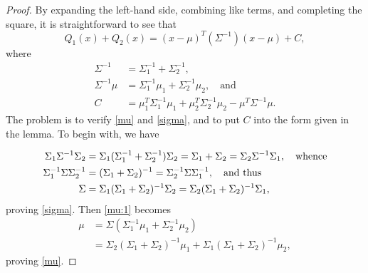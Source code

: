\documentclass[12pt,leqno]{article}
\begin{document}
\begin{proof}

  By expanding the left-hand side, combining like terms, and completing the
  square, it is straightforward to see that
$$
Q_1(x) + Q_2(x) = (x-\mu)^T(\Sigma^{-1})(x-\mu) + C,
$$
where
\begin{align}
 \Sigma^{-1} &= \Sigma_1^{-1} + \Sigma_2^{-1},\label{Sigma}\\
  \Sigma^{-1}\mu &=\Sigma_1^{-1}\mu_1+\Sigma_2^{-1}\mu_2, \quad\text{and}\label{mu:1}\\
  C &= \mu_1^T\Sigma_1^{-1}\mu_1 +\mu_2^T\Sigma_2^{-1}\mu_2 - \mu^T\Sigma^{-1}\mu.
  \label{C}
\end{align}
The problem is to verify \eqref{mu} and \eqref{sigma}, and to put $C$ into the form given in the lemma.
 To begin with, we have

\begin{align}
  \Sigma_1\Sigma^{-1}\Sigma_2 &= \Sigma_1(\Sigma_1^{-1}+\Sigma_2^{-1})\Sigma_2 = \Sigma_1+\Sigma_2
  = \Sigma_2\Sigma^{-1}\Sigma_1,\quad\text{whence}\notag\\
  \Sigma_1^{-1}\Sigma\Sigma_2^{-1} &= (\Sigma_1+\Sigma_2)^{-1} = \Sigma_2^{-1}\Sigma\Sigma_1^{-1},\quad\text{and thus}\notag\\
  \Sigma &= \Sigma_1(\Sigma_1 + \Sigma_2)^{-1}\Sigma_2 = \Sigma_2(\Sigma_1+\Sigma_2)^{-1}\Sigma_1,\label{Sigma:1}
\end{align}
proving \eqref{sigma}.  Then \eqref{mu:1} becomes
\begin{equation}\label{mu:2}
  \begin{split}
    \mu &=  \Sigma(\Sigma_1^{-1}\mu_1+\Sigma_2^{-1}\mu_2)\\
    &=\Sigma_2(\Sigma_1+\Sigma_2)^{-1}\mu_1+\Sigma_1(\Sigma_1+\Sigma_2)^{-1}\mu_2,
  \end{split}
\end{equation}
proving \eqref{mu}.


\end{proof}
\end{document}
